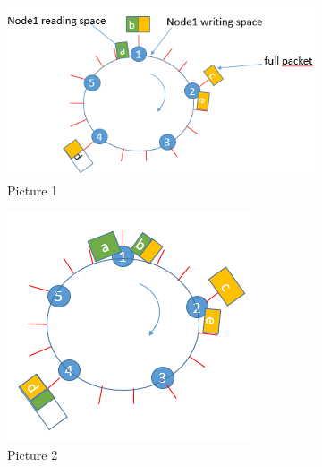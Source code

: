 \documentclass{article}
\begin{document}
\begin{figure}[h!]
  \begin{subfigure}[b]{0.9\textwidth}
    \includegraphics[width=\textwidth]{etape1.png}
    \caption{Picture 1}
    \label{fig:1}
  \end{subfigure}
  \begin{subfigure}[b]{0.5\textwidth}
    \includegraphics[width=\textwidth]{etape2.png}
    \caption{Picture 2}
    \label{fig:2}
  \end{subfigure}
%
  \begin{subfigure}[b]{0.5\textwidth}

\end{subfigure}
\end{figure}
\end{document}
